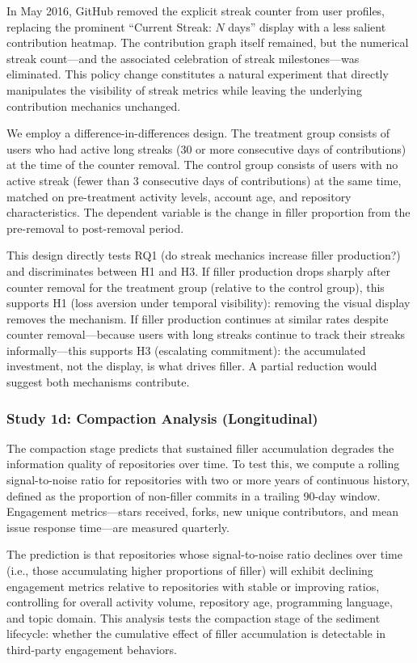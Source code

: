 \documentclass[12pt]{article}
\begin{document}
In May 2016, GitHub removed the explicit streak counter from user profiles, replacing the prominent ``Current Streak: $N$ days'' display with a less salient contribution heatmap. The contribution graph itself remained, but the numerical streak count---and the associated celebration of streak milestones---was eliminated. This policy change constitutes a natural experiment that directly manipulates the visibility of streak metrics while leaving the underlying contribution mechanics unchanged.

We employ a difference-in-differences design. The treatment group consists of users who had active long streaks (30 or more consecutive days of contributions) at the time of the counter removal. The control group consists of users with no active streak (fewer than 3 consecutive days of contributions) at the same time, matched on pre-treatment activity levels, account age, and repository characteristics. The dependent variable is the change in filler proportion from the pre-removal to post-removal period.

This design directly tests RQ1 (do streak mechanics increase filler production?) and discriminates between H1 and H3. If filler production drops sharply after counter removal for the treatment group (relative to the control group), this supports H1 (loss aversion under temporal visibility): removing the visual display removes the mechanism. If filler production continues at similar rates despite counter removal---because users with long streaks continue to track their streaks informally---this supports H3 (escalating commitment): the accumulated investment, not the display, is what drives filler. A partial reduction would suggest both mechanisms contribute.

\subsubsection{Study 1d: Compaction Analysis (Longitudinal)}
\label{sec:study1d}

The compaction stage predicts that sustained filler accumulation degrades the information quality of repositories over time. To test this, we compute a rolling signal-to-noise ratio for repositories with two or more years of continuous history, defined as the proportion of non-filler commits in a trailing 90-day window. Engagement metrics---stars received, forks, new unique contributors, and mean issue response time---are measured quarterly.

The prediction is that repositories whose signal-to-noise ratio declines over time (i.e., those accumulating higher proportions of filler) will exhibit declining engagement metrics relative to repositories with stable or improving ratios, controlling for overall activity volume, repository age, programming language, and topic domain. This analysis tests the compaction stage of the sediment lifecycle: whether the cumulative effect of filler accumulation is detectable in third-party engagement behaviors.
\end{document}
